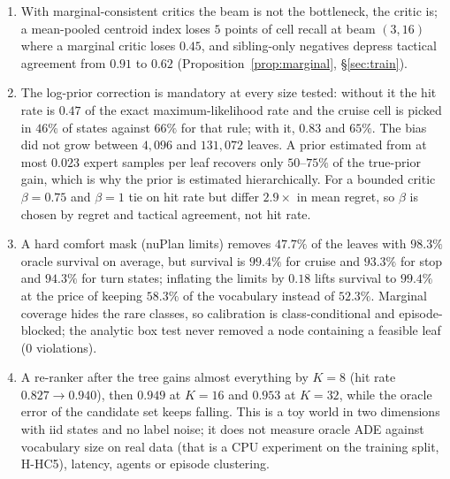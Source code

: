 \begin{enumerate}[label=(\roman*),leftmargin=2em]
\item With marginal-consistent critics the beam is not the bottleneck, the critic is; a mean-pooled centroid index loses $5$ points of cell recall at beam $(3,16)$ where a marginal critic loses $0.45$, and sibling-only negatives depress tactical agreement from $0.91$ to $0.62$ (Proposition~\ref{prop:marginal}, \S\ref{sec:train}).
\item The log-prior correction is mandatory at every size tested: without it the hit rate is $0.47$ of the exact maximum-likelihood rate and the cruise cell is picked in $46\%$ of states against $66\%$ for that rule; with it, $0.83$ and $65\%$. The bias did not grow between $4{,}096$ and $131{,}072$ leaves. A prior estimated from at most $0.023$ expert samples per leaf recovers only $50$--$75\%$ of the true-prior gain, which is why the prior is estimated hierarchically. For a bounded critic $\beta=0.75$ and $\beta=1$ tie on hit rate but differ $2.9\times$ in mean regret, so $\beta$ is chosen by regret and tactical agreement, not hit rate.
\item A hard comfort mask (nuPlan limits) removes $47.7\%$ of the leaves with $98.3\%$ oracle survival on average, but survival is $99.4\%$ for cruise and $93.3\%$ for stop and $94.3\%$ for turn states; inflating the limits by $0.18$ lifts survival to $99.4\%$ at the price of keeping $58.3\%$ of the vocabulary instead of $52.3\%$. Marginal coverage hides the rare classes, so calibration is class-conditional and episode-blocked; the analytic box test never removed a node containing a feasible leaf ($0$ violations).
\item A re-ranker after the tree gains almost everything by $K=8$ (hit rate $0.827\to0.940$), then $0.949$ at $K=16$ and $0.953$ at $K=32$, while the oracle error of the candidate set keeps falling. This is a toy world in two dimensions with iid states and no label noise; it does not measure oracle ADE against vocabulary size on real data (that is a CPU experiment on the training split, H-HC5), latency, agents or episode clustering.
\end{enumerate}

